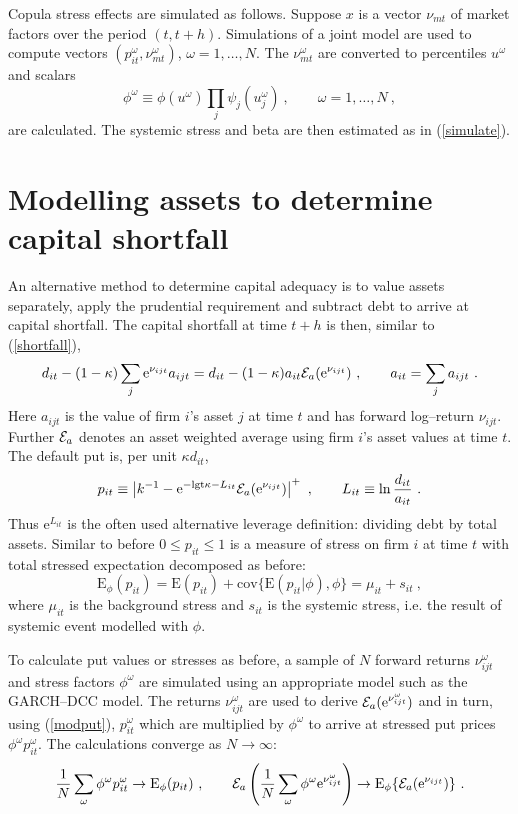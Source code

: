 \documentclass[12pt]{article}
\newcommand{\logit}{\mathrm{lgt}}
\newcommand{\E}{\mathrm{E}}
\newcommand{\e}{\mathrm{e}}
\renewcommand{\o}{\omega}
\newcommand{\cov}{\mathrm{cov}}
\newcommand{\Ex}{{\cal E}}
\newcommand{\Es}{\E_\phi}
\newcommand{\eref}[1]{(\ref{#1})}
\newcommand{\cq}{\ , \qquad}
\newcommand{\be}[1]{\begin{equation}\label{#1}}
\newcommand{\ee}{\end{equation}}
\begin{document}
Copula stress effects are simulated as follows.   Suppose $x$ is a vector $\nu_{mt}$ of  market factors  over the period $(t,t+h)$.   Simulations of a joint model are  used to  compute vectors $(p_{it}^\o,\nu_{mt}^\o)$, $ \o=1,\ldots, N$.  The $\nu_{mt}^\o$ are  converted to percentiles $u^\o$ and scalars
$$
\phi^\o\equiv\phi(u^\o)\prod_j\psi_j(u_j^\o)\cq \o=1,\ldots, N\ ,
$$
are calculated. The systemic stress and beta are then estimated as in \eref{simulate}.



\section{Modelling assets to determine capital shortfall}\label{riskmethod}

An alternative method to determine capital adequacy is to value  assets separately, apply the prudential requirement and subtract debt to arrive at capital shortfall.   The capital shortfall at time $t+h$ is then, similar to \eref{shortfall},
\be{csrwa}
d_{it} - (1-\kappa)\sum_j \e^{\nu_{ijt}}a_{ijt}  = d_{it} - (1-\kappa)a_{it}\Ex_a(\e^{\nu_{ijt}})\cq a_{it}=\sum_j a_{ijt}\ .
\ee
Here $a_{ijt}$ is the value of firm $i$'s asset  $j$ at time $t$ and has forward log--return $\nu_{ijt}$.  Further  $\Ex_a$ denotes an asset weighted average using  firm $i$'s asset values at time $t$. The default put is, per unit $\kappa d_{it}$,
\be{modput}
p_{it}\equiv \left|k^{-1} - \e^{-\logit\kappa-L_{it}}\Ex_a(\e^{\nu_{ijt}})\right|^+ \cq L_{it}\equiv \ln\frac{d_{it}}{a_{it}} \ .
\ee
Thus $\e^{L_{it}}$ is the often used alternative leverage definition: dividing debt by total assets.   Similar to before $0\le p_{it}\le 1$ is a measure of  stress on firm $i$ at time $t$ with total stressed expectation decomposed as before:
$$
\Es(p_{it}) = \E(p_{it}) + \cov\{\E(p_{it}|\phi),\phi\} = \mu_{it} + s_{it}\ ,
$$
where $\mu_{it}$ is the background stress and $s_{it}$ is the systemic stress, i.e. the result of systemic event modelled with $\phi$.

To calculate put values or stresses as before, a sample of $N$ forward returns $\nu_{ijt}^\o$ and stress factors $\phi^\o$ are  simulated using an appropriate model such as the GARCH--DCC model.   The returns $\nu_{ijt}^\o$ are used to derive $\Ex_a(\e^{\nu_{ijt}^\o})$ and in turn, using \eref{modput},   $p_{it}^\o$ which are multiplied by $\phi^\o$ to arrive at stressed put prices  $\phi^\o p_{it}^\o$.  The calculations converge as $N\rightarrow\infty$:
\be{rwa}
\frac{1}{N}\sum_\o \phi^\o p_{it}^\o\rightarrow \Es(p_{it})\cq \Ex_a\left( \frac{1}{N}\sum_\o\phi^\o\e^{\nu_{ijt}^\o}\right)\rightarrow \Es\{\Ex_a(\e^{\nu_{ijt}})\}\ .
\ee
\end{document}
